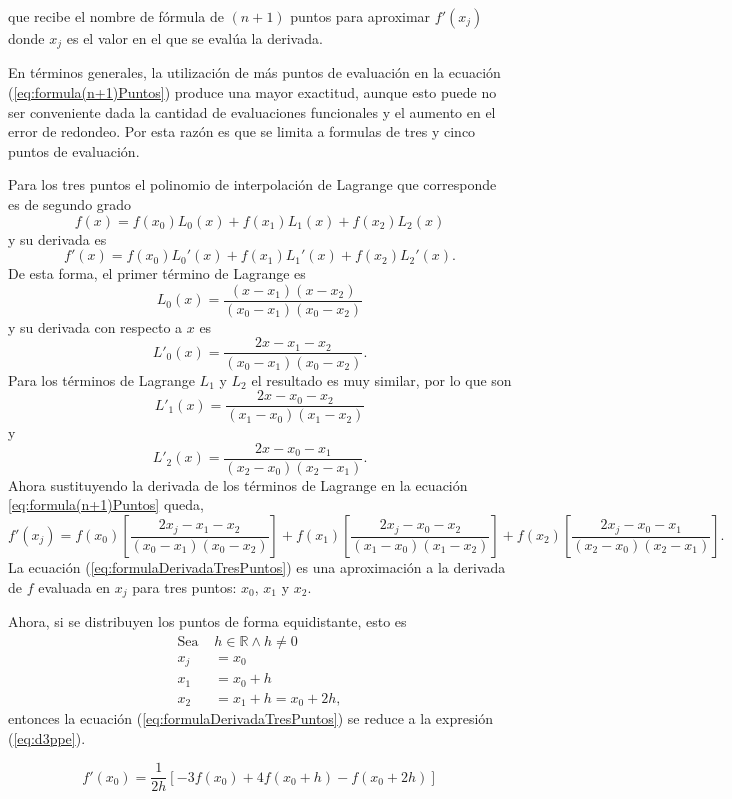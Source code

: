 que recibe el nombre de fórmula de $(n+1)$ puntos para aproximar $f'(x_j)$ donde $x_j$ es el valor en el que se evalúa la derivada.

En términos generales, la utilización de más puntos de evaluación en la ecuación (\ref{eq:formula(n+1)Puntos}) produce una mayor 
exactitud, aunque esto puede no ser conveniente dada la cantidad de evaluaciones funcionales y el aumento en el error de redondeo. 
Por esta razón es que se limita a formulas de tres y cinco puntos de evaluación. 

Para los tres puntos el polinomio de interpolación de Lagrange que corresponde es de segundo grado
\[ f(x) = f(x_0)L_0(x) + f(x_1)L_1(x) + f(x_2)L_2(x) \]
y su derivada es
\[ f'(x) = f(x_0)L_0'(x) + f(x_1)L_1'(x) + f(x_2)L_2'(x).\]
De esta forma, el primer término de Lagrange es
\[ L_0(x) = \dfrac{(x-x_1)(x-x_2)}{(x_0-x_1)(x_0-x_2)} \]
y su derivada con respecto a $x$ es
\[ L'_0(x) = \dfrac{2x-x_1-x_2}{(x_0-x_1)(x_0-x_2)}. \]
Para los términos de Lagrange $L_1$ y $L_2$ el resultado es muy similar, por lo que son 
\[ L'_1(x) = \dfrac{2x-x_0-x_2}{(x_1-x_0)(x_1-x_2)} \]
y 
\[ L'_2(x) = \dfrac{2x-x_0-x_1}{(x_2-x_0)(x_2-x_1)}. \]
Ahora sustituyendo la derivada de los términos de Lagrange en la ecuación \ref{eq:formula(n+1)Puntos} queda,
\begin{equation}
	f'(x_j) = f(x_0)\left[\dfrac{2x_j - x_1 - x_2}{(x_0-x_1)(x_0-x_2)}\right] + 
	f(x_1)\left[\dfrac{2x_j - x_0 - x_2}{(x_1-x_0)(x_1-x_2)}\right] 
	+ f(x_2)\left[\dfrac{2x_j - x_0 - x_1}{(x_2-x_0)(x_2-x_1)}\right].
	\label{eq:formulaDerivadaTresPuntos}
\end{equation}
La ecuación (\ref{eq:formulaDerivadaTresPuntos}) es una aproximación a la derivada de $f$ evaluada en $x_j$ para tres puntos:
$x_0$, $x_1$ y $x_2$.

Ahora, si se distribuyen los puntos de forma equidistante, esto es 
\begin{align*}
	\mbox{Sea }& h\in\mathbb{R} \wedge h\not=0 \\
	x_j &= x_0\\
	x_1 &= x_0 + h \\ 
	x_2 &= x_1 + h = x_0+2h,
\end{align*}
entonces la ecuación (\ref{eq:formulaDerivadaTresPuntos}) se reduce a la expresión (\ref{eq:d3ppe}).

\begin{definitionT}
	\begin{equation}
		f'(x_0) = \dfrac{1}{2h}\left[-3f(x_0)+4f(x_0+h)-f(x_0+2h)\right]
		\label{eq:d3ppe}
	\end{equation}
\end{definitionT}

